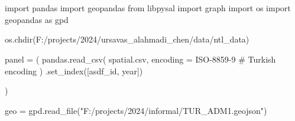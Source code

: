 \documentclass[
  letterpaper,
  DIV=11,
  numbers=noendperiod]{scrreprt}
\newenvironment{Shaded}{\begin{snugshade}}{\end{snugshade}}
\newcommand{\CommentTok}[1]{\textcolor[rgb]{0.37,0.37,0.37}{#1}}
\newcommand{\ImportTok}[1]{\textcolor[rgb]{0.00,0.46,0.62}{#1}}
\newcommand{\NormalTok}[1]{\textcolor[rgb]{0.00,0.23,0.31}{#1}}
\newcommand{\OperatorTok}[1]{\textcolor[rgb]{0.37,0.37,0.37}{#1}}
\newcommand{\StringTok}[1]{\textcolor[rgb]{0.13,0.47,0.30}{#1}}
\begin{document}
\begin{Shaded}
\begin{Highlighting}[]


\end{Highlighting}
\end{Shaded}


\chapter{}\label{section}

\begin{Shaded}
\begin{Highlighting}[]
\ImportTok{import}\NormalTok{ pandas}
\ImportTok{import}\NormalTok{ geopandas}
\ImportTok{from}\NormalTok{ libpysal }\ImportTok{import}\NormalTok{ graph}
\ImportTok{import}\NormalTok{ os}
\ImportTok{import}\NormalTok{ geopandas }\ImportTok{as}\NormalTok{ gpd}
\end{Highlighting}
\end{Shaded}

\begin{Shaded}
\begin{Highlighting}[]
\NormalTok{os.chdir(}\StringTok{\textquotesingle{}F:/projects/2024/ursavas\_alahmadi\_chen/data/ntl\_data\textquotesingle{}}\NormalTok{)}
\end{Highlighting}
\end{Shaded}

\begin{Shaded}
\begin{Highlighting}[]
\NormalTok{panel }\OperatorTok{=}\NormalTok{ (}
\NormalTok{    pandas.read\_csv(}
        \StringTok{\textquotesingle{}spatial.csv\textquotesingle{}}\NormalTok{, }
\NormalTok{        encoding }\OperatorTok{=} \StringTok{\textquotesingle{}ISO{-}8859{-}9\textquotesingle{}} \CommentTok{\# Turkish encoding}
\NormalTok{    )}
\NormalTok{    .set\_index([}\StringTok{\textquotesingle{}asdf\_id\textquotesingle{}}\NormalTok{, }\StringTok{\textquotesingle{}year\textquotesingle{}}\NormalTok{])}
    
\NormalTok{)}
\end{Highlighting}
\end{Shaded}

\begin{Shaded}
\begin{Highlighting}[]
\NormalTok{geo }\OperatorTok{=}\NormalTok{ gpd.read\_file(}\StringTok{"F:/projects/2024/informal/TUR\_ADM1.geojson"}\NormalTok{)}
\end{Highlighting}
\end{Shaded}
\end{document}
